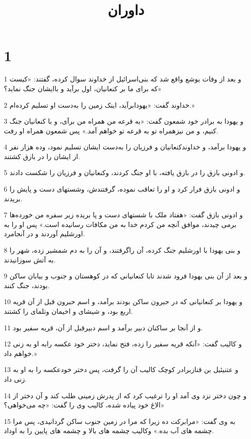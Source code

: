 

\title{داوران}

 
\chapter{1}

\par 1 و بعد از وفات یوشع واقع شد که بنی‌اسرائیل از خداوند سوال کرده، گفتند: «کیست که برای ما بر کنعانیان، اول برآید و باایشان جنگ نماید؟»
\par 2 خداوند گفت: «یهودابرآید، اینک زمین را به‌دست او تسلیم کرده‌ام.»
\par 3 و یهودا به برادر خود شمعون گفت: «به قرعه من همراه من برآی، و با کنعانیان جنگ کنیم، و من نیزهمراه تو به قرعه تو خواهم آمد.» پس شمعون همراه او رفت.
\par 4 و یهودا برآمد، و خداوندکنعانیان و فرزیان را به‌دست ایشان تسلیم نمود، وده هزار نفر از ایشان را در بازق کشتند.
\par 5 و ادونی بازق را در بازق یافته، با او جنگ کردند، وکنعانیان و فرزیان را شکست دادند.
\par 6 و ادونی بازق فرار کرد و او را تعاقب نموده، گرفتندش، وشستهای دست و پایش را بریدند.
\par 7 و ادونی بازق گفت: «هفتاد ملک با شستهای دست و پا بریده زیر سفره من خورده‌ها برمی چیدند، موافق آنچه من کردم خدا به من مکافات رسانیده است.» پس او را به اورشلیم آوردند و در آنجامرد.
\par 8 و بنی یهودا با اورشلیم جنگ کرده، آن راگرفتند، و آن را به دم شمشیر زده، شهر را به آتش سوزانیدند.
\par 9 و بعد از آن بنی یهودا فرود شدند تابا کنعانیانی که در کوهستان و جنوب و بیابان ساکن بودند، جنگ کنند.
\par 10 و یهودا بر کنعانیانی که در حبرون ساکن بودند برآمد، و اسم حبرون قبل از آن قریه اربع بود، و شیشای و اخیمان وتلمای را کشتند.
\par 11 و از آنجا بر ساکنان دبیر برآمد و اسم دبیرقبل از آن، قریه سفیر بود.
\par 12 و کالیب گفت: «آنکه قریه سفیر را زده، فتح نماید، دختر خود عکسه رابه او به زنی خواهم داد.»
\par 13 و عتنیئیل بن قنازبرادر کوچک کالیب آن را گرفت، پس دختر خودعکسه را به او به زنی داد.
\par 14 و چون دختر نزد وی آمد او را ترغیب کرد که از پدرش زمینی طلب کند و آن دختر از الاغ خود پیاده شده، کالیب وی را گفت: «چه می‌خواهی؟»
\par 15 به وی گفت: «مرابرکت ده زیرا که مرا در زمین جنوب ساکن گردانیدی، پس مرا چشمه های آب بده.» وکالیب چشمه های بالا و چشمه های پایین را به اوداد.
